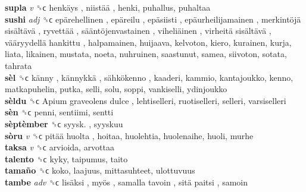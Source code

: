 \textbf{supla} \emph{v}  ␝ϲ   henkäys ,  niistää , henki, puhallus, puhaltaa  \\
\textbf{sushi} \emph{adj}  ␝ϲ   epärehellinen ,  epäreilu ,  epäsiisti ,  epäurheilijamainen ,  merkintöjä sisältävä ,  ryvettää ,  sääntöjenvastainen ,  viheliäinen ,  virheitä sisältävä ,  vääryydellä hankittu , halpamainen, huijaava, kelvoton, kiero, kurainen, kurja, liata, likainen, mustata, noeta, nuhruinen, saastunut, samea, siivoton, sotata, tahrata  \\
\textbf{sèl} ␝ϲ   känny ,  kännykkä ,  sähkökenno , kaaderi, kammio, kantajoukko, kenno, matkapuhelin, putka, selli, solu, soppi, vankiselli, ydinjoukko  \\
\textbf{sèldu} ␝ϲ   Apium graveolens dulce , lehtiselleri, ruotiselleri, selleri, varsiselleri  \\
\textbf{sèn} ␝ϲ  penni, sentiimi, sentti  \\
\textbf{sèptèmber} ␝ϲ   syysk. , syyskuu  \\
\textbf{sòru} \emph{v}  ␝ϲ   pitää huolta , hoitaa, huolehtia, huolenaihe, huoli, murhe  \\
\textbf{taksa} \emph{v}  ␝ϲ  arvioida, arvottaa  \\
\textbf{talento} ␝ϲ  kyky, taipumus, taito  \\
\textbf{tamaño} ␝ϲ  koko, laajuus, mittasuhteet, ulottuvuus  \\
\textbf{tambe} \emph{adv}  ␝ϲ   lisäksi ,  myös ,  samalla tavoin ,  sitä paitsi , samoin  \\
